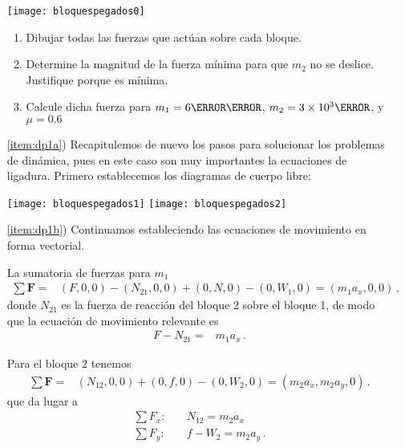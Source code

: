 \begin{enumerate}
  \begin{minipage}{0.4\linewidth}
    \texttt{[image: bloquespegados0]}
  \end{minipage}
  \begin{minipage}{0.6\linewidth}
    \begin{enumerate}
    \item Dibujar todas las fuerzas que actúan sobre cada bloque.
      \label{item:dp1a}
    \item Determine la magnitud de la fuerza mínima para que $m_2$ no se deslice. Justifique porque es mínima.
      \label{item:dp1b}
    \item Calcule dicha fuerza para $m_1=6\kilo\gram$, $m_2=3\times 10^3\gram$, y $\mu=0.6$
      \label{item:dp1c}
    \end{enumerate}
  \end{minipage}

  \item[\ref{item:dp1a})] Recapitulemos de nuevo los pasos para solucionar los problemas de dinámica, pues en este caso son muy importantes la ecuaciones de ligadura. Primero establecemos los diagramas de cuerpo libre:
 
\texttt{[image: bloquespegados1]} \texttt{[image: bloquespegados2]}

  \item[\ref{item:dp1b})] Continuamos estableciendo las ecuaciones de movimiento en forma vectorial.  


La sumatoria de fuerzas para $m_1$
    \begin{align*}
    \sum \mathbf{F}=&(F,0,0)-(N_{21},0,0)+(0,N,0)-(0,W_1,0)=(m_1 a_x,0,0)\,,  
    \end{align*}
    donde $N_{21}$ es la fuerza de reacción del bloque 2 sobre el bloque 1, de modo que la ecuación de movimiento relevante es
    \begin{align}
      \label{eq:dp1}
      F-N_{21}=&m_1 a_x\,.
    \end{align}

    Para el bloque 2 tenemos
    \begin{align*}
    \sum \mathbf{F}=&(N_{12},0,0)+(0,f,0)-(0,W_2,0)=(m_2a_x,m_2 a_y,0)\,. 
    \end{align*}
    que da lugar a
    \begin{align}
      \label{eq:dp2}
      \sum F_x:\quad&N_{12}=m_2 a_x\nonumber\\
      \sum F_y:\quad&f-W_2=m_2 a_y\,.
    \end{align}


\end{enumerate}
